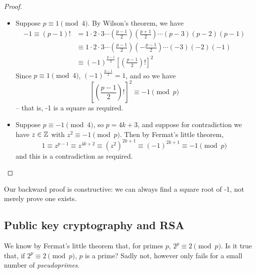 \documentclass{../template/note}
\begin{document}
    \begin{proof}
        \begin{itemize}
            \item[\(\impliedby\)] Suppose \(p \equiv 1 \pmod 4\). By Wilson's theorem, we have
            \begin{align*}
                -1 \equiv (p-1)! &= 1 \cdot 2 \cdot 3 \cdots \left(\frac{p-1}{2}\right) \left(\frac{p+1}{2}\right)\cdots (p-3)(p-2)(p-1) \\
                &\equiv 1 \cdot 2 \cdot 3 \cdots \left(\frac{p-1}{2}\right) \left(-\frac{p-1}{2}\right)\cdots (-3)(-2)(-1) \\
                &\equiv (-1)^\frac{p-1}{2} \left[\left(\frac{p-1}{2}\right)!\right]^2
            \end{align*}
            Since \(p \equiv 1 \pmod 4\), \((-1)^\frac{p-1}{2} = 1\), and so we have
            \[
                \left[\left(\frac{p-1}{2}\right)!\right]^2 \equiv -1 \pmod p
            \]
            -- that is, -1 is a square as required.
            \item[\(\implies\)] Suppose \(p \equiv -1 \pmod 4\), so \(p = 4k + 3\), and suppose for contradiction we have \(z \in \mathbb Z\) with \(z^2 \equiv -1 \pmod p\). Then by Fermat's little theorem,
            \[
                1 \equiv z^{p-1} \equiv z^{4k + 2} \equiv (z^2)^{2k+1} \equiv (-1)^{2k+1} \equiv -1 \pmod p
            \]
            and this is a contradiction as required.
        \end{itemize}
    \end{proof}
    
    \begin{remark*}
        Our backward proof is constructive: we can always find a square root of -1, not merely prove one exists.
    \end{remark*}
    
    \subsection{Public key cryptography and RSA}

    We know by Fermat's little theorem that, for primes \(p\), \(2^p \equiv 2 \pmod p\). Is it true that, if \(2^p \equiv 2 \pmod p\), \(p\) is a prime? Sadly not, however only fails for a small number of \emph{pseudoprimes}.
\end{document}
